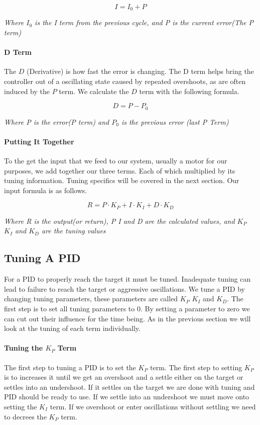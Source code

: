 \documentclass[12pt]{article}
\begin{document}
    $$ I = I_0 + P$$
    \begin{center}\em{Where $I_0$ is the I term from the previous cycle, and P is the current error(The P term)}\end{center}

\paragraph{D Term}
    The $D$ (Derivative) is how fast the error is changing. The D term helps bring the controller out of a oscillating state caused by repeated overshoots, as are often induced by the $P$ term. We calculate the $D$ term with the following formula.

    $$D = P - P_0$$
    \begin{center}\em{Where P is the error(P term) and $P_0$ is the previous error (last P Term)}\end{center}

\paragraph{Putting It Together}
    To the get the input that we feed to our system, usually a motor for our purposes, we add together our three terms. Each of which multiplied by its tuning information. Tuning specifics will be covered in the next section. Our input formula is as follows.

    $$ R = P \cdot K_P + I \cdot K_I + D \cdot K_D$$
    \begin{center}
        \em{Where R is the output(or return), P I and D are the calculated values, and $K_P$ $K_I$ and $K_D$ are the tuning values}
    \end{center}

\subsection{Tuning A PID}
    For a PID to properly reach the target it must be tuned. Inadequate tuning can lead to failure to reach the target or aggressive oscillations. We tune a PID by changing tuning parameters, these parameters are called $K_P$ $K_I$ and $K_D$. The first step is to set all tuning parameters to 0. By setting a parameter to zero we can cut out their influence for the time being. As in the previous section we will look at the tuning of each term individually.

\paragraph{Tuning the $K_P$ Term}
    The first step to tuning a PID is to set the $K_P$ term. The first step to setting $K_P$ is to increases it until we get an overshoot and a settle either on the target or settles into an undershoot. If it settles on the target we are done with tuning and PID should be ready to use. If we settle into an undershoot we must move onto setting the $K_I$ term. If we overshoot or enter oscillations without settling we need to decrees the $K_P$ term.
\end{document}

